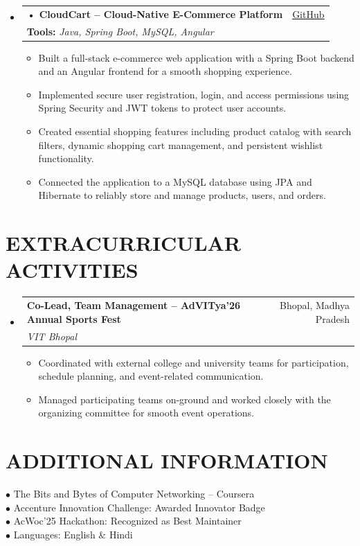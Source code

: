 \documentclass[letterpaper,10pt]{article}
\makeatletter
\newcommand{\resumeItem}[1]{
  \item\small{
    {#1 \vspace{-1pt}}
  }
}
\newcommand{\resumeSubheading}[4]{
  \vspace{-1pt}\item[]
    \begin{tabular*}{0.98\textwidth}[t]{l@{\extracolsep{\fill}}r}
      \textbf{#1} & #2 \\
      \textit{\small#3} & \textit{\small #4} \\
    \end{tabular*}\vspace{-3pt}
}
\newcommand{\resumeProjectHeading}[3]{
    \vspace{-1pt}\item[]
    \begin{tabular*}{0.98\textwidth}[t]{l@{\extracolsep{\fill}}r}
      \textbf{#1} & #3 \\
      \multicolumn{2}{l}{\small \textbf{Tools:} \textit{#2}} \\
    \end{tabular*}\vspace{-3pt}
}
\makeatother
\begin{document}
\begin{itemize}[label={}]
      \resumeProjectHeading
          {• CloudCart -- Cloud-Native E-Commerce Platform}
          {Java, Spring Boot, MySQL, Angular}
          {\href{https://github.com/}{\underline{GitHub}}}
          \begin{itemize}
            \resumeItem{Built a full-stack e-commerce web application with a Spring Boot backend and an Angular frontend for a smooth shopping experience.}
            \resumeItem{Implemented secure user registration, login, and access permissions using Spring Security and JWT tokens to protect user accounts.}
            \resumeItem{Created essential shopping features including product catalog with search filters, dynamic shopping cart management, and persistent wishlist functionality.}
            \resumeItem{Connected the application to a MySQL database using JPA and Hibernate to reliably store and manage products, users, and orders.}
          \end{itemize}

    \end{itemize}

\vspace{-3pt}

\section{EXTRACURRICULAR ACTIVITIES}
  \begin{itemize}[label={}]
    \resumeSubheading
      {Co-Lead, Team Management -- AdVITya'26 Annual Sports Fest}{Bhopal, Madhya Pradesh}
      {VIT Bhopal}{}
      \begin{itemize}
        \resumeItem{Coordinated with external college and university teams for participation, schedule planning, and event-related communication.}
        \resumeItem{Managed participating teams on-ground and worked closely with the organizing committee for smooth event operations.}
      \end{itemize}
  \end{itemize}

\vspace{-3pt}

\section{ADDITIONAL INFORMATION}
 \begin{itemize}[label={}]
    \small{\item[]{
     $\bullet$ The Bits and Bytes of Computer Networking -- Coursera \\ \vspace{1.5pt}
     $\bullet$ Accenture Innovation Challenge: Awarded Innovator Badge \\ \vspace{1.5pt}
     $\bullet$ AcWoc'25 Hackathon: Recognized as Best Maintainer \\ \vspace{1.5pt}
     $\bullet$ Languages: English \& Hindi
    }}
 \end{itemize}
\end{document}
